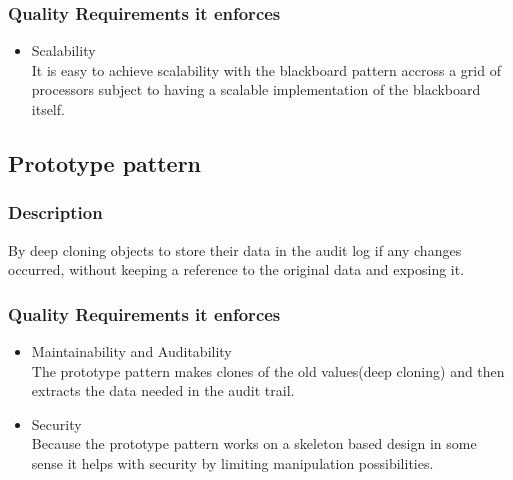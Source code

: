 		\subsubsection{Quality Requirements it enforces}
		\begin{itemize}
			\item Scalability\\
It is easy to achieve scalability with the blackboard pattern accross a grid of processors subject to having a scalable implementation of the blackboard itself.
		\end{itemize}	
		
	\subsection{Prototype pattern}
		\subsubsection{Description}
 			By deep cloning objects to store their data in the audit log if any changes occurred, without keeping a reference to the original data and exposing it.
		\subsubsection{Quality Requirements it enforces}
		\begin{itemize}
			\item Maintainability and Auditability\\
The prototype pattern makes clones of the old values(deep cloning) and then extracts the data needed in the audit trail.
			\item Security\\
Because the prototype pattern works on a skeleton based design in some sense it helps with security by limiting manipulation possibilities.

		\end{itemize}	